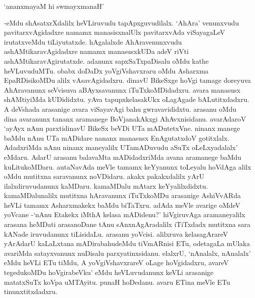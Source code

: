 \begin{shloka}
`ananxmayaM hi swmayxmanaH'
\end{shloka}

-eMdu shAsatxrXdalilx heVLiruvudu tapApxguvudilalx. `AhAra' venunxvudu pavitarxvAgidadxre namamx manasisxnalUlx pavitarxvAda viSayagaLeV irutatxveMdu tiLiyutatxde. hAgalalxde AhAravenunxvudu ashAMtikaravAgidadxre namamx manasusxkUDa adeV riVti ashAMtikaravAgirutatxde. adanunx sapxSaTxpaDisalu oMdu kathe heVLuvuduMTu. obabx doDaDx yoVgiVshavxraru oMdu Asharxma EpaRDisikoMDu alilx vAsavAgidadxru. dinavU BikeSxge hoVgi tamage doreyuva AhAravanunx seVvisuva aBAyxsavanunx iTuTxkoMDidadxru. avara manasusx shAMtiyiMda kUDididxtu. yAva tapupxkelasakUkx oLagAgade bALutitxdadxru. A deVshada arasanige avara viSayavAgi bahu gwravavididxtu. arasanu oMdu dina avaranunx tananx aramanege BoVjanakAkxgi AhAvxnisidanu. avarAdaroV `ayAyx nAnu parxtidinavU BikeSx beVDi UTa mADutetxVne. ninanx manege baMdu nAnu UTa mADidare nananx manasusx EnAgutatxdoV gotitxlalx. AdadxriMda nAnu ninanx maneyalilx UTamADuvudu aSuTx  oLeLxyadalalx' eMdaru. AdarU arasanu balavaMta mADidadxriMda avana aramanege baMdu kuLitukoMDaru. autaNavAda meVle tamamx keYyanunx toLeyalu hoVdAga alilx oMdu mutitxna saravanunx noVDidaru. akakx pakakxdalilx yArU ilalxdiruvudanunx kaMDaru. kamaMDalu mAtarx keYyalilxdidxtu. kamaMDalunalilx mutitxna hAravanunx iTuTxkoMDu arasanige AshiVvARda heVLi tamamx Asharxmakekx baMdu biTaTxru. adAda meVle avarige oMdeV yoVcane -`nAnu Etakekx iMthA kelasa mADidenu?' hiVgiruvAga aramaneyalilx arasana heMDati arasanoDane tAnu sAnxnAgAradalilx iTiTxdadx mutitxna sara kANade iruvudanunx tiLisidaLu. arasanu yoVcisi. alilxruva kelasagArareV yArAdarU kaLaLxtana mADirabahudeMdu tiVmARnisi ETu, odetagaLa mUlaka avariMda satayxvanunx nuDisalu parxyatinxsidanu. elalxrU, `nAnalalx, nAnalalx' eMdu heVLi ETu tiMdu, A yoVgiVshavxrareV oLage hoVgidadxru, avareV tegedukoMDu hoVgirabeVku' eMdu heVLuvudanunx keVLi arasanige matatxSuTx koVpa uMTAyitu. punaH hoDedanu. avaru ETina meVle ETu tinunxtitxdadxru.

